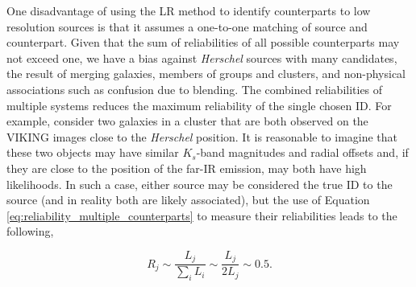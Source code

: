 One disadvantage of using the LR method to identify counterparts to low resolution sources is that it assumes a one-to-one matching of source and counterpart. Given that the sum of reliabilities of all possible counterparts may not exceed one, we have a bias against \textit{Herschel} sources with many candidates, the result of merging galaxies, members of groups and clusters, and non-physical associations such as confusion due to blending. The combined reliabilities of multiple systems reduces the maximum reliability of the single chosen ID. For example, consider two galaxies in a cluster that are both observed on the VIKING images close to the \textit{Herschel} position. It is reasonable to imagine that these two objects may have similar $K_s$-band magnitudes and radial offsets and, if they are close to the position of the far-IR emission, may both have high likelihoods. In such a case, either source may be considered the true ID to the source (and in reality both are likely associated), but the use of Equation \ref{eq:reliability_multiple_counterparts} to measure their reliabilities leads to the following, 

\begin{equation}
    R_j \sim \frac{L_j}{\sum_i L_i} \sim \frac{L_j}{2L_j} \sim 0.5.
\end{equation}

